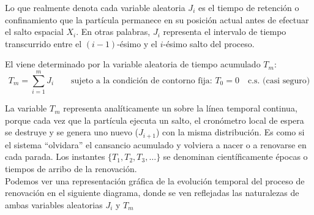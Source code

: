 \begin{observacion}
    Lo que realmente denota cada variable aleatoria $J_i$ es el tiempo de retención o confinamiento que la partícula permanece en su posición actual antes de efectuar el salto espacial $X_i$. En otras palabras, $J_i$ representa el intervalo de tiempo transcurrido entre el $(i-1)$-ésimo y el $i$-ésimo salto del proceso. \\
\end{observacion}

\begin{definicion}
    El  viene determinado por la variable aleatoria de tiempo acumulado $T_m$:
    \[
    T_m = \sum_{i=1}^{m} J_i \qquad \text{sujeto a la condición de contorno fija: } T_0 = 0 \quad \text{c.s. (casi seguro)}
    \]
\end{definicion}
\noindent
La variable $T_m$ representa analíticamente un  sobre la línea temporal continua, porque cada vez que la partícula ejecuta un salto, el cronómetro local de espera se destruye y se genera uno nuevo ($J_{i+1}$) con la misma distribución. Es como si el sistema ``olvidara'' el cansancio acumulado y volviera a nacer o a renovarse en cada parada. Los instantes $\{T_1, T_2, T_3, \dots\}$ se denominan científicamente épocas o tiempos de arribo de la renovación. \\

\noindent
Podemos ver una representación gráfica de la evolución temporal del proceso de renovación en el siguiente diagrama, donde se ven reflejadas las naturalezas de ambas variables aleatorias $J_i$ y $T_m$
    \begin{center}
    \end{center}

